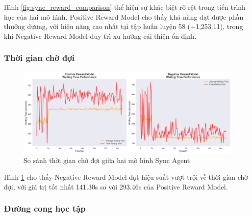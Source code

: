Hình \ref{fig:sync_reward_comparison} thể hiện sự khác biệt rõ rệt trong tiến
trình học của hai mô hình. Positive Reward Model cho thấy khả năng đạt được phần thưởng
dương, với hiệu năng cao nhất tại tập huấn luyện 58 (+1,253.11), trong khi Negative
Reward Model duy trì xu hướng cải thiện ổn định.

\subsubsection{Thời gian chờ đợi}

\begin{figure}[!htp]
    \centering
    \includegraphics[width=\textwidth]{figures/sync_waiting_time_comparison.png}
    \caption{So sánh thời gian chờ đợi giữa hai mô hình Sync Agent}
    \label{fig:sync_waiting_time_comparison}
\end{figure}

Hình \ref{fig:sync_waiting_time_comparison} cho thấy Negative Reward Model đạt
hiệu suất vượt trội về thời gian chờ đợi, với giá trị tốt nhất 141.30s so với
293.46s của Positive Reward Model.

\subsubsection{Đường cong học tập}

